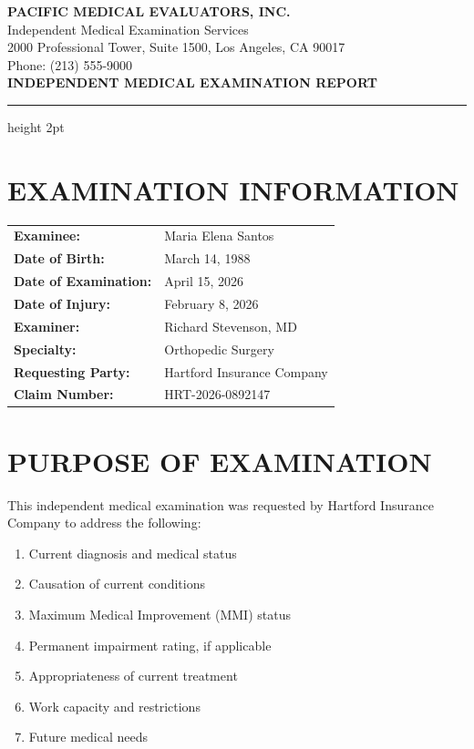 \documentclass[11pt]{article}
\begin{document}
\begin{center}
{\Large\bfseries\color{imeblue} PACIFIC MEDICAL EVALUATORS, INC.}\\[0.3em]
{\small Independent Medical Examination Services}\\
{\small 2000 Professional Tower, Suite 1500, Los Angeles, CA 90017}\\
{\small Phone: (213) 555-9000}\\[1em]
{\LARGE\bfseries INDEPENDENT MEDICAL EXAMINATION REPORT}
\end{center}

\vspace{0.5em}
\hrule height 2pt
\vspace{1em}

\section*{EXAMINATION INFORMATION}

\begin{tabular}{@{}p{4cm}p{10cm}@{}}
\textbf{Examinee:} & Maria Elena Santos \\
\textbf{Date of Birth:} & March 14, 1988 \\
\textbf{Date of Examination:} & April 15, 2026 \\
\textbf{Date of Injury:} & February 8, 2026 \\
\textbf{Examiner:} & Richard Stevenson, MD \\
\textbf{Specialty:} & Orthopedic Surgery \\
\textbf{Requesting Party:} & Hartford Insurance Company \\
\textbf{Claim Number:} & HRT-2026-0892147 \\
\end{tabular}

\section*{PURPOSE OF EXAMINATION}

This independent medical examination was requested by Hartford Insurance Company to address the following:

\begin{enumerate}
\item Current diagnosis and medical status
\item Causation of current conditions
\item Maximum Medical Improvement (MMI) status
\item Permanent impairment rating, if applicable
\item Appropriateness of current treatment
\item Work capacity and restrictions
\item Future medical needs
\end{enumerate}
\end{document}
